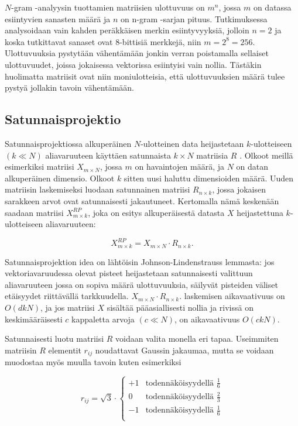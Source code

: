 $N$-gram -analyysin tuottamien matriisien ulottuvuus on $m^n$, jossa $m$ on datassa esiintyvien sanasten määrä ja $n$ on n-gram -sarjan pituus. Tutkimuksessa analysoidaan vain kahden peräkkäisen merkin esiintyvyyksiä, 
jolloin $n=2$ ja koska tutkittavat sanaset ovat 8-bittisiä merkkejä, niin $m=2^8=256$. Ulottuvuuksia pystytään vähentämään jonkin verran poistamalla sellaiset ulottuvuudet, joissa jokaisessa vektorissa esiintyisi vain nollia.
Tästäkin huolimatta matriisit ovat niin moniulotteisia, että ulottuvuuksien määrä tulee pystyä jollakin tavoin vähentämään. 

\subsection{Satunnaisprojektio}

Satunnaisprojektiossa alkuperäinen $N$-ulotteinen data heijastetaan $k$-ulotteiseen $(k \ll N)$ aliavaruuteen käyttäen satunnaista $k \times N$ matriisia $R$ \cite{Random}. Olkoot meillä esimerkiksi matriisi 
$X_{m\times N}$, jossa $m$ on havaintojen määrä, ja $N$ on datan alkuperäinen dimensio. Olkoot  $k$  sitten uusi haluttu dimensioiden määrä. Uuden matriisin laskemiseksi luodaan satunnainen matriisi 
$R_{n \times k}$, jossa jokaisen sarakkeen arvot ovat satunnaisesti jakautuneet. Kertomalla nämä keskenään saadaan matriisi $X_{m \times k}^{RP}$, joka on esitys alkuperäisestä datasta $X$ heijastettuna $k$-ulotteiseen 
aliavaruuteen:

\begin{equation}
X_{m \times k}^{RP} = X_{m \times N} \cdot R_{n \times k}.
\label{RP}
\end{equation}

Satunnaisprojektion idea on lähtöisin Johnson-Lindenstrauss lemmasta: jos vektoriavaruudessa olevat pisteet heijastetaan satunnaisesti valittuun aliavaruuteen jossa on sopiva määrä ulottuvuuksia, säilyvät pisteiden
väliset etäisyydet riittävällä tarkkuudella. $X_{m \times N} \cdot R_{n \times k}.$ laskemisen aikavaativuus on $O(dkN)$, ja jos matriisi $X$ sisältää pääasiallisesti nollia ja rivissä on keskimääräisesti $c$ kappaletta arvoja 
$(c \ll N)$, on aikavaativuus $O(ckN)$.

Satunnaisesti luotu matriisi $R$ voidaan valita monella eri tapaa. Useimmiten matriisin $R$ elementit $r_{ij}$ noudattavat Gaussin jakaumaa, mutta se voidaan muodostaa myös muulla tavoin kuten esimerkiksi

\begin{equation}
r_{ij} = \sqrt{3}\cdot 
\begin{cases}
 +1 &\text{todennäköisyydellä $\frac{1}{6}$} \\
 0 &\text{todennäköisyydellä $\frac{2}{3}$} \\
 -1 &\text{todennäköisyydellä $\frac{1}{6}$} \\
\end{cases}
\label{RPChoice}
\end{equation}

